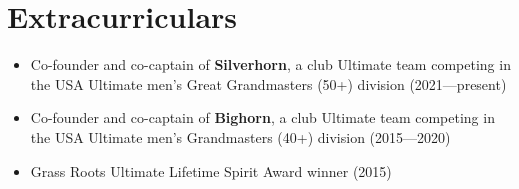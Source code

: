\section{Extracurriculars}
\vspace{0.5em}

\begin{itemize}
  \item Co-founder and co-captain of \textbf{Silverhorn}, a club Ultimate
    team competing in the USA Ultimate men's Great Grandmasters (50+)
    division (2021---present)
  \item Co-founder and co-captain of \textbf{Bighorn}, a club Ultimate
    team competing in the USA Ultimate men's Grandmasters (40+)
    division (2015---2020)
  \item Grass Roots Ultimate Lifetime Spirit Award winner (2015)
\end{itemize}
